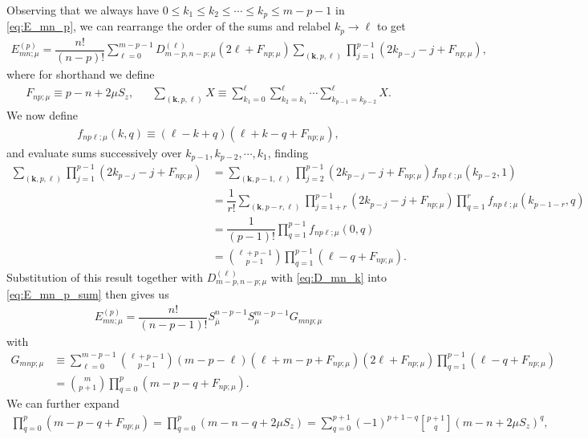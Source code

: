 \documentclass[aps,notitlepage,nofootinbib,11pt]{revtex4-1}
\newcommand{\f}[2]{\dfrac{#1}{#2}} %
\newcommand{\p}[1]{\left(#1\right)} %
\renewcommand{\v}{\bm} %
\newcommand{\bmu}{{\bar\mu}}
\newcommand{\1}{\mathds{1}}
\begin{document}
Observing that we always have
$0\le k_1\le k_2\le\cdots\le k_p\le m-p-1$ in \eqref{eq:E_mn_p}, we
can rearrange the order of the sums and relabel $k_p\to\ell$ to get
\begin{align}
  E_{mn;\mu}^{(p)}
  = \f{n!}{\p{n-p}!}
  \sum_{\ell=0}^{m-p-1} D_{m-p,n-p;\mu}^{(\ell)} \p{2\ell+F_{np;\mu}}
  \sum_{\p{\v k,p,\ell}} \prod_{j=1}^{p-1} \p{2k_{p-j}-j+F_{np;\mu}},
  \label{eq:E_mn_p_sum}
\end{align}
where for shorthand we define
\begin{align}
  F_{np;\mu} \equiv p - n + 2\mu S_z,
  &&
  \sum_{\p{\v k,p,\ell}} X \equiv
  \sum_{k_1=0}^\ell \sum_{k_2=k_1}^\ell
  \cdots \sum_{k_{p-1}=k_{p-2}}^\ell X.
\end{align}
We now define
\begin{align}
  f_{np\ell;\mu}\p{k,q} \equiv \p{\ell-k+q} \p{\ell+k-q+F_{np;\mu}},
\end{align}
and evaluate sums successively over $k_{p-1},k_{p-2},\cdots,k_1$,
finding
\begin{align}
  \sum_{\p{\v k,p,\ell}} \prod_{j=1}^{p-1} \p{2k_{p-j}-j+F_{np;\mu}}
  &= \sum_{\p{\v k,p-1,\ell}}
  \prod_{j=2}^{p-1} \p{2k_{p-j}-j+F_{np;\mu}}
  f_{np\ell;\mu}\p{k_{p-2},1} \\
  &= \f1{r!} \sum_{\p{\v k,p-r,\ell}}
  \prod_{j=1+r}^{p-1} \p{2k_{p-j}-j+F_{np;\mu}}
  \prod_{q=1}^r f_{np\ell;\mu}\p{k_{p-1-r},q} \\
  &= \f1{\p{p-1}!} \prod_{q=1}^{p-1} f_{np\ell;\mu}\p{0,q} \\
  &= { \ell + p - 1 \choose p - 1 }
  \prod_{q=1}^{p-1} \p{\ell-q+F_{np;\mu}}.
\end{align}
Substitution of this result together with $D_{m-p,n-p;\mu}^{(\ell)}$
with \eqref{eq:D_mn_k} into \eqref{eq:E_mn_p_sum} then gives us
\begin{align}
  E_{mn;\mu}^{(p)}
  = \f{n!}{\p{n-p-1}!} S_\bmu^{n-p-1} S_\mu^{m-p-1} G_{mnp;\mu}
\end{align}
with
\begin{align}
  G_{mnp;\mu}
  &\equiv \sum_{\ell=0}^{m-p-1} { \ell + p - 1 \choose p - 1 }
  \p{m-p-\ell} \p{\ell+m-p+F_{np;\mu}}
  \p{2\ell + F_{np;\mu}}
  \prod_{q=1}^{p-1} \p{\ell-q+F_{np;\mu}} \\
  &= { m \choose p + 1 } \prod_{q=0}^p \p{m-p-q+F_{np;\mu}}.
\end{align}
We can further expand
\begin{align}
  \prod_{q=0}^p \p{m-p-q+F_{np;\mu}}
  = \prod_{q=0}^p \p{m-n-q+2\mu S_z}
  = \sum_{q=0}^{p+1} \p{-1}^{p+1-q} { p+1 \brack q } \p{m-n+2\mu S_z}^q,
\end{align}
\end{document}
